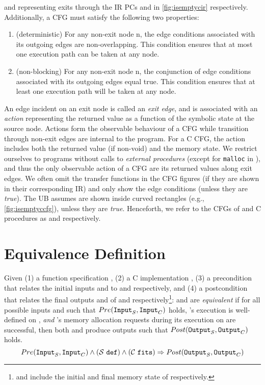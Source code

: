  and  representing exits through the IR PCs  and  in \cref{fig:isemptycir} respectively.
Additionally, a CFG must satisfy the following
two properties:
\vspace{-10px}
\begin{enumerate}
\item[] (deterministic) For any non-exit node n, the edge conditions associated with its outgoing edges are non-overlapping.
This condition ensures that at most one execution path can be taken at any node.
\item[] (non-blocking) For any non-exit node n, the conjunction of edge conditions associated with its outgoing edges equal true.
This condition ensures that at least one execution path will be taken at any node.
\end{enumerate}
\vspace{-10px}
An edge incident on an exit node is called an {\em exit edge}, and is associated with an {\em action} representing
the returned value as a function of the symbolic state at the source node.
Actions form the observable behaviour of a CFG while transition through non-exit edges are internal to the program.
For a C CFG, the action includes both the returned value (if non-void) and the memory state.
We restrict ourselves to programs without calls to {\em external procedures} (except for {\tt malloc} in \cprog{}),
and thus the only observable action of a CFG are its returned values along exit edges.
We often omit the transfer functions in the CFG figures (if they are shown in their corresponding IR)
and only show the edge conditions (unless they are {\em true}).
The UB assumes are shown inside curved rectangles (e.g., \cref{fig:isemptyccfg}), unless they are {\em true}.
Henceforth, we refer to the CFGs of \SpecL{} and C procedures as \sprog{} and \cprog{} respectively.
\newpage
\section{Equivalence Definition}
\label{sec:eqdef}
Given (1) a \SpecL{} function specification \sprog{}, (2) a C implementation \cprog{},
(3) a precondition \pre{} that relates the initial inputs  and  to
\sprog{} and \cprog{} respectively, and (4) a postcondition \post{} that relates the final outputs
 and  of \sprog{} and \cprog{} respectively\footnote{ and 
include the initial and final memory state of \cprog{} respectively.}:
\sprog{} and \cprog{} are {\em equivalent} if for all possible inputs  and  such that
${Pre}{}({\tt Input}_{S},{\tt Input}_{C})$ holds,
\sprog{}'s execution is well-defined on , {\em and}
\cprog{}'s memory allocation requests during its execution on  are successful,
then both \sprog{} and \cprog{} produce outputs such that ${Post}{}({\tt Output}_{S},{\tt Output}_{C})$ holds.
$$
{Pre}{}({\tt Input}_{S},{\tt Input}_{C}) \land {({\ensuremath{\mathcal{S}}}{}\ {\tt def})}{} \land {({\ensuremath{\mathcal{C}}}{}\ {\tt fits})}{} \Rightarrow {\ensuremath{Post}}{}({\tt Output}_{S},{\tt Output}_{C})
$$

